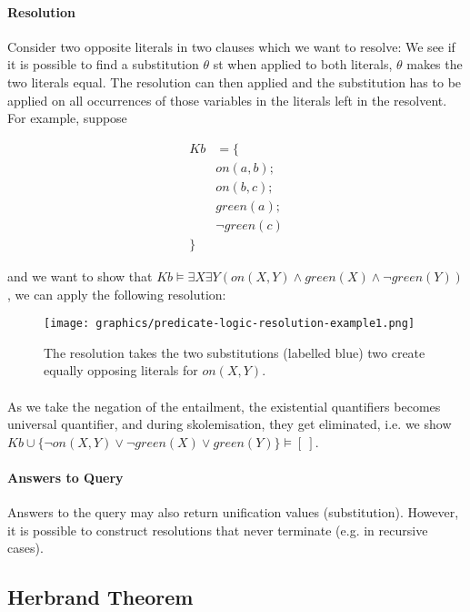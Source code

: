 \documentclass{article}
\theoremstyle{plain}
\theoremstyle{definition}
\begin{document}
\begin{multicols}{2}
\paragraph{Resolution} Consider two opposite literals in two clauses which we want to resolve: We see if it is possible to find a substitution $\theta$ st when applied to both literals, $\theta$ makes the two literals equal. The resolution can then applied and the substitution has to be applied on all occurrences of those variables in the literals left in the resolvent. For example, suppose

\begin{align*}
Kb &= \{\\
	&on(a, b);\\
	&on(b, c);\\
	&green(a);\\
	&\lnot green(c)\\
	\}&
\end{align*}

\noindent and we want to show that $Kb \models \exists X \exists Y (on(X, Y) \land green(X) \land \lnot green(Y))$, we can apply the following resolution:

\begin{figure}[H]
\centering
\texttt{[image: graphics/predicate-logic-resolution-example1.png]}
\caption{The resolution takes the two substitutions (labelled blue) two create equally opposing literals for $on(X, Y)$.}
\end{figure}

\paragraph{} As we take the negation of the entailment, the existential quantifiers becomes universal quantifier, and during skolemisation, they get eliminated, i.e. we show $Kb \cup \{\lnot on(X,Y)\lor \lnot green(X) \lor green(Y)\} \models [\ ]$.

\paragraph{Answers to Query} Answers to the query may also return unification values (substitution). However, it is possible to construct resolutions that never terminate (e.g. in recursive cases).

\subsection{Herbrand Theorem}


\end{multicols}
\end{document}
